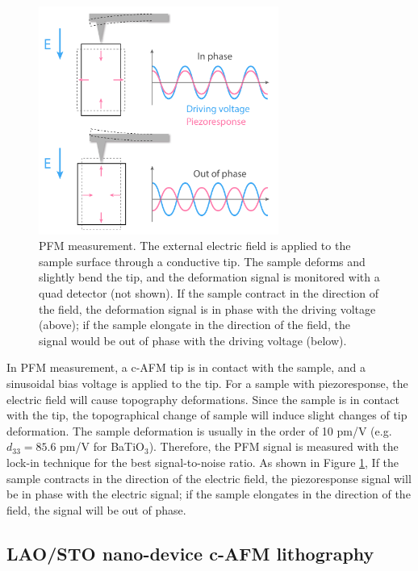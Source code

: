 \documentclass[pdflatex, sectionletters, 12pt]{pittetd}    %
\begin{document}
\begin{figure}[p]
	\centering
	\includegraphics[width=0.7\textwidth]{Drawing/PFM.pdf}
	\caption{PFM measurement. The external electric field is applied to the sample surface through a conductive tip. The sample deforms and slightly bend the tip, and the deformation signal is monitored with a quad detector (not shown). If the sample contract in the direction of the field, the deformation signal is in phase with the driving voltage (above); if the sample elongate in the direction of the field, the signal would be out of phase with the driving voltage (below).}
	\label{FIG:PFM}
\end{figure}

In PFM measurement, a c-AFM tip is in contact with the sample, and a sinusoidal bias voltage is applied to the tip. For a sample with piezoresponse, the electric field will cause topography deformations. Since the sample is in contact with the tip, the topographical change of sample will induce slight changes of tip deformation. The sample deformation is usually in the order of 10 pm/V (e.g. $d_{33} = 85.6$ pm/V for BaTiO$_3$\cite{berlincourt1958elastic}). Therefore, the PFM signal is measured with the lock-in technique for the best signal-to-noise ratio. As shown in Figure \ref{FIG:PFM}, If the sample contracts in the direction of the electric field, the piezoresponse signal will be in phase with the electric signal; if the sample elongates in the direction of the field, the signal will be out of phase.

\subsection{LAO/STO nano-device c-AFM lithography}
\label{SEC:AFMLitho}
\end{document}
